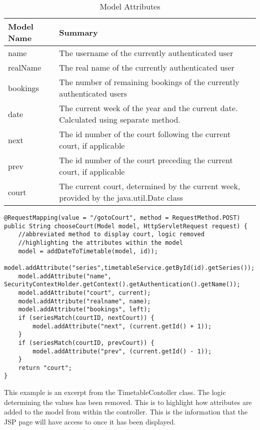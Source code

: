 \begin{table}[H]
\begin{center}
    \begin{tabular}{ | l | l | p{5cm} |}
    \hline
    Model Name & Summary \\ \hline
    name & The username of the currently authenticated user  \\ \hline
    realName & The real name of the currently authenticated user\\ \hline
	bookings & The number of remaining bookings of the currently authenticated users\\ \hline
	date & The current week of the year and the current date. Calculated using separate method.\\ \hline
	next & The id number of the court following the current court, if applicable\\ \hline
    prev & The id number of the court preceding the current court, if applicable\\ \hline
	court & The current court, determined by the current week, provided by the java.util.Date class \\
    \hline
    \end{tabular}
\end{center}
\caption{Model Attributes}
\end{table}
\pagebreak
\begin{lstlisting}
@RequestMapping(value = "/gotoCourt", method = RequestMethod.POST)
public String chooseCourt(Model model, HttpServletRequest request) {
	//abbreviated method to display court, logic removed
	//highlighting the attributes within the model
	model = addDateToTimetable(model, id));
	model.addAttribute("series",timetableService.getById(id).getSeries());
	model.addAttribute("name", SecurityContextHolder.getContext().getAuthentication().getName());
	model.addAttribute("court", current);
	model.addAttribute("realname", name);
	model.addAttribute("bookings", left);
	if (seriesMatch(courtID, nextCourt)) {
		model.addAttribute("next", (current.getId() + 1));
	}
	if (seriesMatch(courtID, prevCourt)) {
		model.addAttribute("prev", (current.getId() - 1));
	}
	return "court";
}
\end{lstlisting}	

This example is an excerpt from the TimetableContoller class. The logic determining the values has been removed. This is to highlight how attributes are added to the model from within the controller. This is the information that the JSP page will have access to once it has been displayed.

